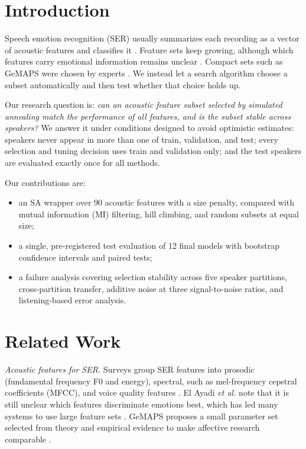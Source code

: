 \documentclass[conference]{IEEEtran}
\begin{document}
\section{Introduction}

Speech emotion recognition (SER) usually summarizes each recording as a vector of acoustic
features and classifies it \cite{akcay2020,elayadi2011}. Feature sets keep growing, although
which features carry emotional information remains unclear \cite{elayadi2011}. Compact sets such
as GeMAPS were chosen by experts \cite{eyben2016gemaps}. We instead let a search algorithm choose
a subset automatically and then test whether that choice holds up.

Our research question is: \emph{can an acoustic feature subset selected by simulated annealing
match the performance of all features, and is the subset stable across speakers?} We answer it
under conditions designed to avoid optimistic estimates: speakers never appear in more than one
of train, validation, and test; every selection and tuning decision uses train and validation
only; and the test speakers are evaluated exactly once for all methods.

Our contributions are:
\begin{itemize}
\item an SA wrapper over 90 acoustic features with a size penalty, compared with mutual
information (MI) filtering, hill climbing, and random subsets at equal size;
\item a single, pre-registered test evaluation of 12 final models with bootstrap confidence
intervals and paired tests;
\item a failure analysis covering selection stability across five speaker partitions,
cross-partition transfer, additive noise at three signal-to-noise ratios, and listening-based
error analysis.
\end{itemize}

\section{Related Work}

\emph{Acoustic features for SER.} Surveys group SER features into prosodic (fundamental
frequency F0 and energy), spectral, such as mel-frequency cepstral coefficients (MFCC), and
voice quality features \cite{akcay2020,elayadi2011}. El Ayadi \emph{et al.} note that it is
still unclear which features discriminate emotions best, which has led many systems to use
large feature sets \cite{elayadi2011}. GeMAPS proposes a small parameter set selected from theory
and empirical evidence to make affective research comparable \cite{eyben2016gemaps}.
\end{document}
